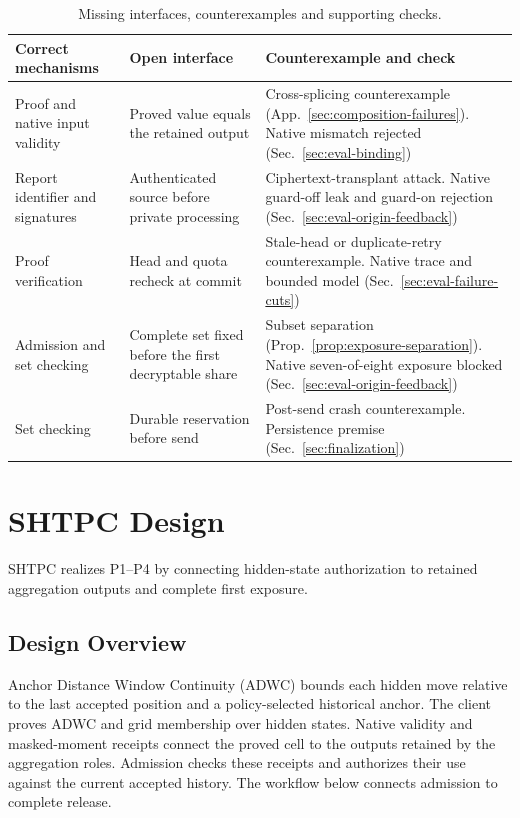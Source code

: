 \documentclass[conference,compsoc]{IEEEtran}
\theoremstyle{definition}
\numberwithin{equation}{section}
\numberwithin{table}{section}
\numberwithin{figure}{section}
\theoremstyle{plain}
\begin{document}
\begin{table}[t]
\centering
\caption{Missing interfaces, counterexamples and supporting checks.}
\label{tab:interface-necessity}
\footnotesize
\renewcommand{\arraystretch}{1.08}
\begin{tabularx}{\columnwidth}{@{}YYY@{}}
\toprule
\textbf{Correct mechanisms} & \textbf{Open interface} & \textbf{Counterexample and check} \\
\midrule
Proof and native input validity & Proved value equals the retained output & Cross-splicing counterexample (App.~\ref{sec:composition-failures}). Native mismatch rejected (Sec.~\ref{sec:eval-binding}) \\
Report identifier and signatures & Authenticated source before private processing & Ciphertext-transplant attack. Native guard-off leak and guard-on rejection (Sec.~\ref{sec:eval-origin-feedback}) \\
Proof verification & Head and quota recheck at commit & Stale-head or duplicate-retry counterexample. Native trace and bounded model (Sec.~\ref{sec:eval-failure-cuts}) \\
Admission and set checking & Complete set fixed before the first decryptable share & Subset separation (Prop.~\ref{prop:exposure-separation}). Native seven-of-eight exposure blocked (Sec.~\ref{sec:eval-origin-feedback}) \\
Set checking & Durable reservation before send & Post-send crash counterexample. Persistence premise (Sec.~\ref{sec:finalization}) \\
\bottomrule
\end{tabularx}
\end{table}

\section{SHTPC Design}
\label{sec:system}

SHTPC realizes P1--P4 by connecting hidden-state authorization to
retained aggregation outputs and complete first exposure.
\subsection{Design Overview}
\label{sec:architecture-choice}
\label{sec:overview}

Anchor Distance Window Continuity (ADWC) bounds each hidden move relative to
the last accepted position and a policy-selected historical anchor. The client proves ADWC and grid
membership over hidden states. Native validity and masked-moment receipts
connect the proved cell to the outputs retained by the aggregation roles.
Admission checks these receipts and authorizes their use against the current
accepted history. The workflow below connects admission to complete release.
\end{document}
